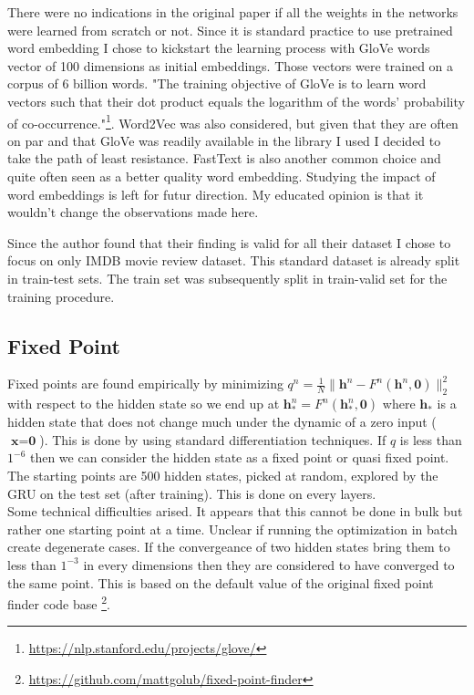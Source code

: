 \documentclass{article}
\begin{document}
There were no indications in the original paper if all the weights in the networks were learned from scratch or not. Since it is standard practice to use pretrained word embedding I chose to kickstart the learning process with GloVe \cite{pennington2014glove} words vector of 100 dimensions as initial embeddings. Those vectors were trained on a corpus of 6 billion words. "The training objective of GloVe is to learn word vectors such that their dot product equals the logarithm of the words' probability of co-occurrence."\footnote{\url{https://nlp.stanford.edu/projects/glove/}}. Word2Vec \cite{mikolov2013efficient} was also considered, but given that they are often on par and that GloVe was readily available in the library I used I decided to take the path of least resistance. FastText \cite{mikolov2018advances} is also another common choice and quite often seen as a better quality word embedding. Studying the impact of word embeddings is left for futur direction. My educated opinion is that it wouldn't change the observations made here.

Since the author found that their finding is valid for all their dataset I chose to focus on only IMDB movie review dataset. This standard dataset is already split in train-test sets. The train set was subsequently split in train-valid set for the training procedure.

\subsection{Fixed Point}
\label{sec:method-fixed_point}
Fixed points are found empirically by minimizing $q^{n}=\frac{1}{N}\|\textbf{h}^{n}-F^{n}(\textbf{h}^{n}, \textbf{0})\|_2^2$ with respect to the hidden state so we end up at $\textbf{h}_{*}^{n}=F^{n}(\textbf{h}_*^{n}, \textbf{0})$ where $\textbf{h}_*$ is a hidden state that does not change much under the dynamic of a zero input ($\textbf{x}=\textbf{0}$). This is done by using standard differentiation techniques. If $q$ is less than  $1^{-6}$ then we can consider the hidden state as a fixed point or quasi fixed point. The starting points are 500 hidden states, picked at random, explored by the GRU on the test set (after training). This is done on every layers. 
\\
Some technical difficulties arised. It appears that this cannot be done in bulk but rather one starting point at a time. Unclear if running the optimization in batch create degenerate cases. If the convergeance of two hidden states bring them to less than $1^{-3}$ in every dimensions then they are considered to have converged to the same point. This is based on the default value of the original fixed point finder code base \footnote{\url{https://github.com/mattgolub/fixed-point-finder}}.
\end{document}

